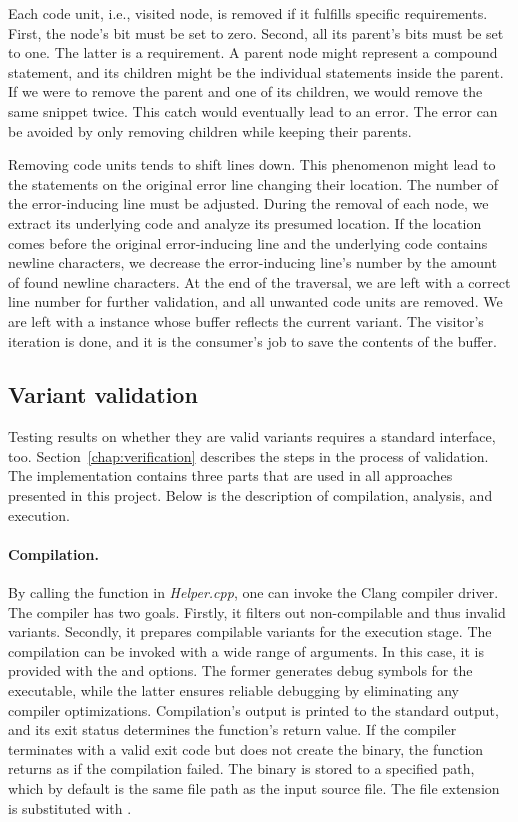 Each code unit, i.e., visited node, is removed if it fulfills specific 
requirements. 
First, the node's bit must be set to zero. 
Second, all its parent's bits must be set to one. 
The latter is a  requirement. 
A parent node might represent a compound statement, and its children might 
be the individual statements inside the parent. 
If we were to remove the parent and one of its children, we would remove 
the same snippet twice. 
This catch would eventually lead to an error. 
The error can be avoided by only removing children while keeping their 
parents.

Removing code units tends to shift lines down. 
This phenomenon might lead to the statements on the original error line 
changing their location. 
The number of the error-inducing line must be adjusted. 
During the removal of each node, we extract its underlying code and analyze 
its presumed location. 
If the location comes before the original error-inducing line and 
the underlying code contains newline characters, we decrease 
the error-inducing line's number by the amount of found newline characters. 
At the end of the traversal, we are left with a correct line number for 
further validation, and all unwanted code units are removed. 
We are left with a  instance whose buffer reflects 
the current variant. 
The visitor's iteration is done, and it is the consumer's job to save 
the contents of the buffer.

\subsection{Variant validation}\label{chap:validationimplementation}

Testing results on whether they are valid variants requires a standard 
interface, too.
Section~\ref{chap:verification} describes the steps in the process 
of validation.
The implementation contains three parts that are used in all approaches 
presented in this project.
Below is the description of compilation, analysis, and execution.

\paragraph{Compilation.} By calling the  function in 
\emph{Helper.cpp}, one can invoke the Clang compiler driver.
The compiler has two goals.
Firstly, it filters out non-compilable and thus invalid variants.
Secondly, it prepares compilable variants for the execution stage.
The compilation can be invoked with a wide range of arguments.
In this case, it is provided with the  and  options.
The former generates debug symbols for the executable, while the latter 
ensures reliable debugging by eliminating any compiler optimizations.
Compilation's output is printed to the standard output, and its exit status 
determines the function's return value.
If the compiler terminates with a valid exit code but does not create 
the binary, the function returns as if the compilation failed.
The binary is stored to a specified path, which by default is the same file 
path as the input source file.
The file extension is substituted with .

